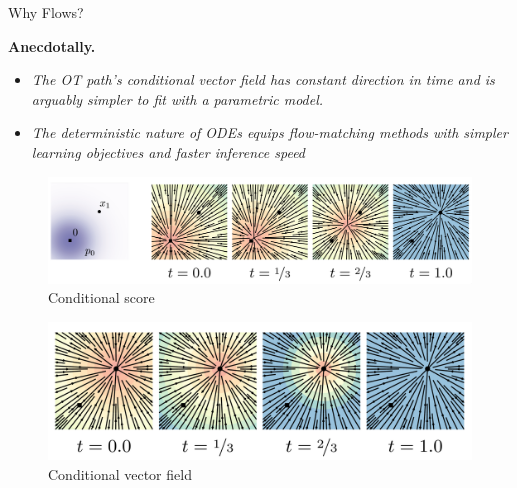 \documentclass{beamer}
\begin{document}
\begin{frame}{Why Flows?}
    \begin{blackblock}
        \textbf{Anecdotally.}
        \begin{itemize}
            \item{\footnotesize \emph{The OT path’s conditional
                vector field has constant direction in time and is arguably simpler to fit with a parametric model. \cite{lipmanFlowMatchingGenerative2023}}}
            \item{\footnotesize \emph{The deterministic
                nature of ODEs equips flow-matching methods with simpler learning objectives and faster inference speed \cite{zhengIntentionConditionedFlowOccupancy2025}}}
        \end{itemize}
    \end{blackblock}
    \vspace*{.5cm}
\begin{figure}
    \hspace*{-.5cm}
    \begin{minipage}{0.50\linewidth}
    \includegraphics[width=1.2\linewidth]{figures/conditional-score.png}
    \hspace*{2.5cm}
    {\footnotesize Conditional score}
    \end{minipage}
    \hspace*{1cm}
    \begin{minipage}{0.39\linewidth}
    \centering
    \includegraphics[width=1.2\linewidth]{figures/conditional-vector-field.png}
    {\footnotesize Conditional vector field}
    \end{minipage}
\end{figure}
\end{frame}
\end{document}
